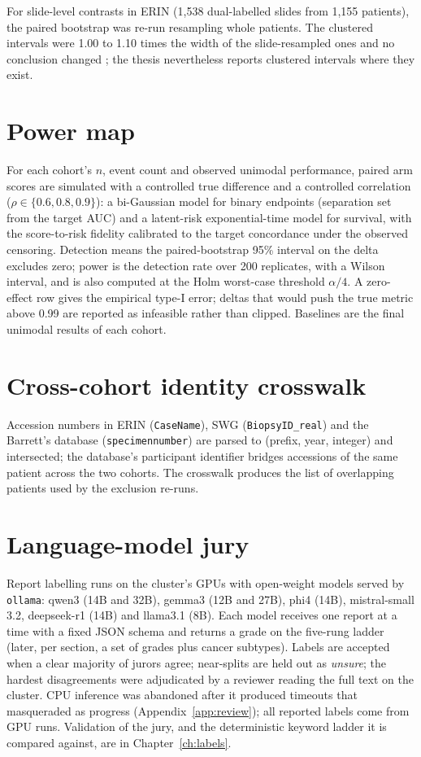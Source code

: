 For slide-level contrasts in ERIN (1,538 dual-labelled slides from 1,155 patients), the paired bootstrap was re-run resampling whole patients. The clustered intervals were 1.00 to 1.10 times the width of the slide-resampled ones and no conclusion changed ; the thesis nevertheless reports clustered intervals where they exist.

\section{Power map}
\label{sec:power_method}

For each cohort's $n$, event count and observed unimodal performance, paired arm scores are simulated with a controlled true difference and a controlled correlation ($\rho \in \{0.6, 0.8, 0.9\}$): a bi-Gaussian model for binary endpoints (separation set from the target AUC) and a latent-risk exponential-time model for survival, with the score-to-risk fidelity calibrated to the target concordance under the observed censoring. Detection means the paired-bootstrap 95\% interval on the delta excludes zero; power is the detection rate over 200 replicates, with a Wilson interval, and is also computed at the Holm worst-case threshold $\alpha/4$. A zero-effect row gives the empirical type-I error; deltas that would push the true metric above 0.99 are reported as infeasible rather than clipped. Baselines are the final unimodal results of each cohort.

\section{Cross-cohort identity crosswalk}
\label{sec:overlap_method}

Accession numbers in ERIN (\texttt{CaseName}), SWG (\texttt{BiopsyID\_real}) and the Barrett's database (\texttt{specimennumber}) are parsed to (prefix, year, integer) and intersected; the database's participant identifier bridges accessions of the same patient across the two cohorts. The crosswalk produces the list of overlapping patients used by the exclusion re-runs.

\section{Language-model jury}
\label{sec:jury_method}

Report labelling runs on the cluster's GPUs with open-weight models served by \texttt{ollama}: qwen3 (14B and 32B), gemma3 (12B and 27B), phi4 (14B), mistral-small 3.2, deepseek-r1 (14B) and llama3.1 (8B). Each model receives one report at a time with a fixed JSON schema and returns a grade on the five-rung ladder (later, per section, a set of grades plus cancer subtypes). Labels are accepted when a clear majority of jurors agree; near-splits are held out as \emph{unsure}; the hardest disagreements were adjudicated by a reviewer reading the full text on the cluster. CPU inference was abandoned after it produced timeouts that masqueraded as progress (Appendix~\ref{app:review}); all reported labels come from GPU runs. Validation of the jury, and the deterministic keyword ladder it is compared against, are in Chapter~\ref{ch:labels}.

